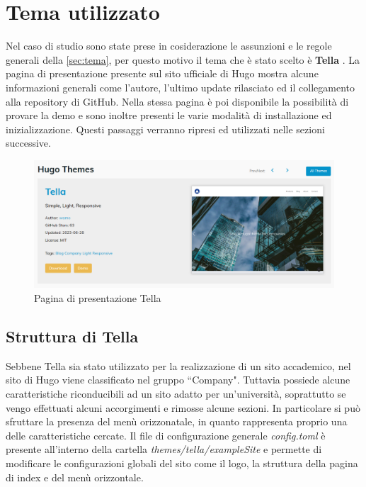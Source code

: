 \documentclass[target=bach,aauheader=]{thud}
\begin{document}
\section{Tema utilizzato}
Nel caso di studio sono state prese in cosiderazione le assunzioni e le regole generali della \cref{sec:tema}, per questo motivo il tema che è stato scelto è \textbf{Tella} \cite{tella-site}.
La pagina di presentazione presente sul sito ufficiale di Hugo mostra alcune informazioni generali come l'autore, l'ultimo update rilasciato ed il collegamento alla repository di GitHub.
\newline
Nella stessa pagina è poi disponibile la possibilità di provare la demo e sono inoltre presenti le varie modalità di installazione ed inizializzazione. Questi passaggi verranno ripresi ed utilizzati nelle sezioni successive.

\begin{figure}
    \centering
    \includegraphics[width = 1\textwidth]{images/Tella.png}
    \caption{Pagina di presentazione Tella}
\end{figure}


\subsection{Struttura di Tella}
Sebbene Tella sia stato utilizzato per la realizzazione di un sito accademico, nel sito di Hugo viene classificato nel gruppo ``Company". Tuttavia possiede alcune caratteristiche riconducibili ad un sito adatto per un'università, soprattutto se vengo effettuati alcuni accorgimenti
e rimosse alcune sezioni. 
In particolare si può sfruttare la presenza del menù orizzonatale, in quanto rappresenta proprio una delle caratteristiche cercate. 
\newline
Il file di configurazione generale \textit{config.toml} è presente all'interno della cartella \textit{themes/tella/exampleSite} e permette di modificare le configurazioni globali del sito come il logo, la struttura della pagina di index e del menù orizzontale.
\end{document}
